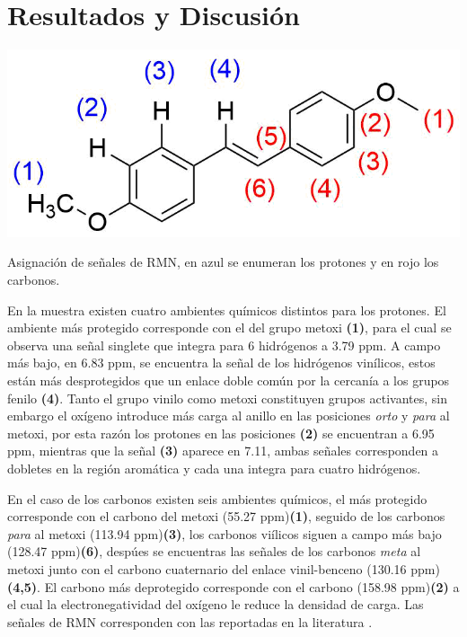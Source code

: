 \documentclass[fleqn,11pt]{SelfArx}
\begin{document}
\newpage

\section{Resultados y Discusi\'on}

\begin{scheme}[h]
	\centering
	\includegraphics[width=0.7\linewidth]{structures/RMN.png}
	\caption{Asignaci\'on de señales de RMN, en azul se enumeran los protones y en rojo los carbonos.}
\end{scheme}

En la muestra existen cuatro ambientes químicos distintos para los protones. El ambiente m\'as protegido corresponde con el del grupo metoxi \textbf{(1)}, para el cual se observa una señal singlete que integra para 6 hidr\'ogenos a 3.79 ppm. A campo m\'as bajo, en 6.83 ppm, se encuentra la señal de los hidr\'ogenos vin\'ilicos, estos est\'an m\'as desprotegidos que un enlace doble com\'un por la cercan\'ia a los grupos fenilo \textbf{(4)}. Tanto el grupo vinilo como metoxi constituyen grupos activantes, sin embargo el ox\'igeno introduce m\'as carga al anillo en las posiciones \textit{orto} y \textit{para} al metoxi, por esta raz\'on los protones en las posiciones \textbf{(2)} se encuentran a 6.95 ppm, mientras que la señal \textbf{(3)} aparece en 7.11, ambas señales corresponden a dobletes en la regi\'on arom\'atica y cada una integra para cuatro hidr\'ogenos. 

En el caso de los carbonos existen seis ambientes qu\'imicos, el m\'as protegido corresponde con el carbono del metoxi (55.27 ppm)\textbf{(1)}, seguido de los carbonos \textit{para} al metoxi (113.94 ppm)\textbf{(3)}, los carbonos vi\'ilicos siguen a campo m\'as bajo (128.47 ppm)\textbf{(6)}, desp\'ues se encuentras las señales de los carbonos \textit{meta} al metoxi junto con el carbono cuaternario del enlace vinil-benceno (130.16 ppm)\textbf{(4,5)}. El carbono m\'as deprotegido corresponde con el carbono (158.98 ppm)\textbf{(2)} a el cual la electronegatividad del ox\'igeno le reduce la densidad de carga. Las señales de RMN corresponden con las reportadas en la literatura \cite{Zhong2016}. 
\end{document}
